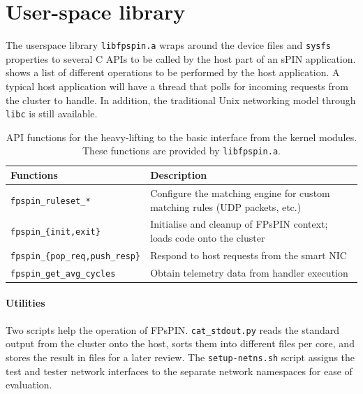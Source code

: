\section{User-space library} \label{sec:sw-lib}

The userspace library \texttt{libfpspin.a} wraps around the device files and \texttt{sysfs} properties to several C APIs to be called by the host part of an sPIN application.   shows a list of different operations to be performed by the host application.  A typical host application will have a thread that polls for incoming requests from the cluster to handle.  In addition, the traditional Unix networking model through \texttt{libc} is still available.

\begin{table}[!t]
    \centering
    \begin{tabular}{ll}
    \toprule
    Functions & Description \\ \midrule
    \texttt{fpspin\_ruleset\_*} & Configure the matching engine for custom matching rules (UDP packets, etc.) \\
    \texttt{fpspin\_\{init,exit\}} & Initialise and cleanup of FPsPIN context; loads code onto the cluster \\
    \texttt{fpspin\_\{pop\_req,push\_resp\}} & Respond to host requests from the smart NIC \\
    \texttt{fpspin\_get\_avg\_cycles} & Obtain telemetry data from handler execution \\
    \bottomrule
    \end{tabular}
    \caption{API functions for the heavy-lifting to the basic interface from the kernel modules.  These functions are provided by \texttt{libfpspin.a}.}
    \label{tab:user-apis}
\end{table}

\paragraph{Utilities} Two scripts help the operation of FPsPIN. \texttt{cat\_stdout.py} reads the standard output from the cluster onto the host, sorts them into different files per core, and stores the result in files for a later review.  The \texttt{setup-netns.sh} script assigns the test and tester network interfaces to the separate network namespaces for ease of evaluation.
